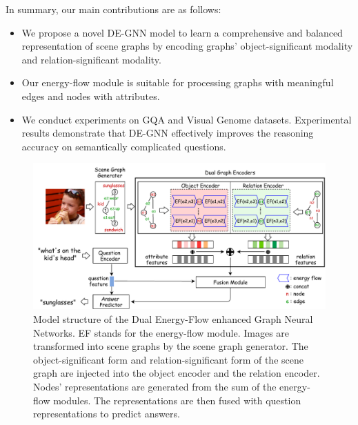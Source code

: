 \documentclass[letterpaper]{article} %
\begin{document}
In summary, our main contributions are as follows:%
\begin{itemize}
\setlength{\itemsep}{5pt}
\setlength{\parsep}{5pt}
\setlength{\parskip}{5pt}
\item We propose a novel DE-GNN model to learn a comprehensive and balanced representation of scene graphs by encoding graphs' object-significant modality and relation-significant modality.\vspace{-0.06in}

\item Our energy-flow module is suitable for processing graphs with meaningful edges and nodes with attributes.\vspace{-0.06in}

\item We conduct experiments on GQA and Visual Genome datasets. Experimental results demonstrate that DE-GNN effectively improves the reasoning accuracy on semantically complicated questions.
\end{itemize}\vspace{-0.06in}

\begin{figure}[ht] 
    \centering 
    \includegraphics[width=1.0\textwidth]{./pic/DE-GNN.pdf} 
    \caption{Model structure of the Dual Energy-Flow enhanced Graph Neural Networks. EF stands for the energy-flow module. Images are transformed into scene graphs by the scene graph generator. The object-significant form and relation-significant form of the scene graph are injected into the object encoder and the relation encoder. Nodes' representations are generated from the sum of the energy-flow modules. The representations are then fused with question representations to predict answers.} 
    \label{fig2} 
\end{figure}
\end{document}
